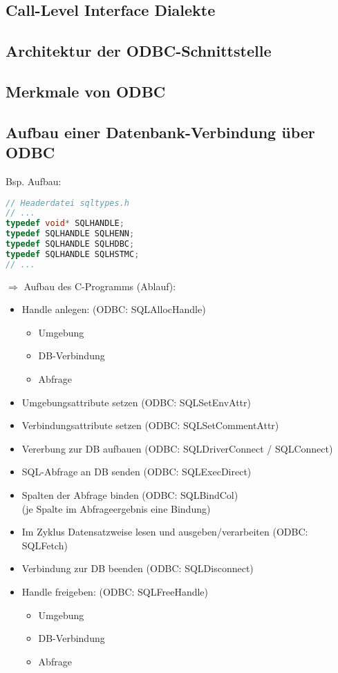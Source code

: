 \subsection{Call-Level Interface Dialekte}
\subsection{Architektur der ODBC-Schnittstelle}
\subsection{Merkmale von ODBC}
\subsection{Aufbau einer Datenbank-Verbindung über ODBC}
Bsp. Aufbau:
\begin{lstlisting}[language=C]
// Headerdatei sqltypes.h
// ...
typedef void* SQLHANDLE;
typedef SQLHANDLE SQLHENN;
typedef SQLHANDLE SQLHDBC;
typedef SQLHANDLE SQLHSTMC;
// ...
\end{lstlisting}
$\Rightarrow$ Aufbau des C-Programms (Ablauf):
\begin{itemize}
\item Handle anlegen: (ODBC: SQLAllocHandle)
\begin{itemize}
\item Umgebung
\item DB-Verbindung
\item Abfrage
\end{itemize}
\item Umgebungsattribute setzen (ODBC: SQLSetEnvAttr)
\item Verbindungsattribute setzen (ODBC: SQLSetCommentAttr)
\item Vererbung zur DB aufbauen (ODBC: SQLDriverConnect / SQLConnect)
\item SQL-Abfrage an DB senden (ODBC: SQLExecDirect)
\item Spalten der Abfrage binden (ODBC: SQLBindCol)\\
(je Spalte im Abfrageergebnis eine Bindung)
\item Im Zyklus Datensatzweise lesen und ausgeben/verarbeiten (ODBC: SQLFetch)
\item Verbindung zur DB beenden (ODBC: SQLDisconnect)
\item Handle freigeben: (ODBC: SQLFreeHandle)
\begin{itemize}
\item Umgebung
\item DB-Verbindung
\item Abfrage
\end{itemize}
\end{itemize}
